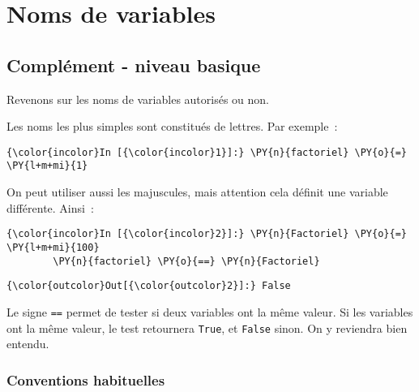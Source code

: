     
    
    
    

    

    \hypertarget{noms-de-variables}{%
\section{Noms de variables}\label{noms-de-variables}}

    \hypertarget{compluxe9ment---niveau-basique}{%
\subsection{Complément - niveau
basique}\label{compluxe9ment---niveau-basique}}

    Revenons sur les noms de variables autorisés ou non.

    Les noms les plus simples sont constitués de lettres. Par exemple~:

    \begin{Verbatim}[commandchars=\\\{\}]
{\color{incolor}In [{\color{incolor}1}]:} \PY{n}{factoriel} \PY{o}{=} \PY{l+m+mi}{1}
\end{Verbatim}


    On peut utiliser aussi les majuscules, mais attention cela définit une
variable différente. Ainsi~:

    \begin{Verbatim}[commandchars=\\\{\}]
{\color{incolor}In [{\color{incolor}2}]:} \PY{n}{Factoriel} \PY{o}{=} \PY{l+m+mi}{100}
        \PY{n}{factoriel} \PY{o}{==} \PY{n}{Factoriel}
\end{Verbatim}


\begin{Verbatim}[commandchars=\\\{\}]
{\color{outcolor}Out[{\color{outcolor}2}]:} False
\end{Verbatim}
            
    Le signe \texttt{==} permet de tester si deux variables ont la même
valeur. Si les variables ont la même valeur, le test retournera
\texttt{True}, et \texttt{False} sinon. On y reviendra bien entendu.

    \hypertarget{conventions-habituelles}{%
\subsubsection{Conventions habituelles}\label{conventions-habituelles}}

